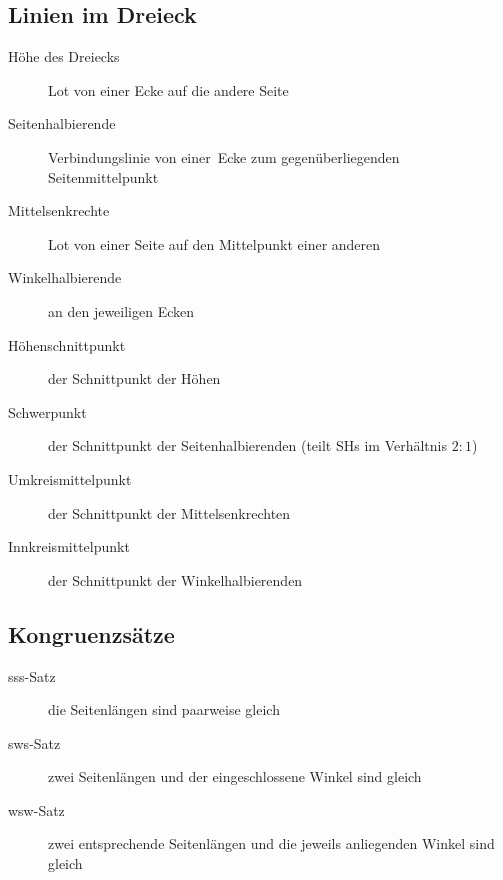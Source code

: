 \documentclass[a4paper,10pt]{article}
\begin{document}
\subsection{Linien im Dreieck}
\begin{description}
\item[Höhe des Dreiecks] Lot von einer Ecke auf die andere Seite
\item[Seitenhalbierende] Verbindungslinie von einer Ecke zum gegenüberliegenden Seitenmittelpunkt
\item[Mittelsenkrechte]  Lot von einer Seite auf den Mittelpunkt einer anderen
\item[Winkelhalbierende] an den jeweiligen Ecken
\item[Höhenschnittpunkt] der Schnittpunkt der Höhen
\item[Schwerpunkt] der Schnittpunkt der Seitenhalbierenden (teilt SHs im Verhältnis $2:1$)
\item[Umkreismittelpunkt] der Schnittpunkt der Mittelsenkrechten
\item[Innkreismittelpunkt] der Schnittpunkt der Winkelhalbierenden
\end{description}

\subsection{Kongruenzsätze}
\begin{description}
\item[sss-Satz] die Seitenlängen sind paarweise gleich
\item[sws-Satz] zwei Seitenlängen und der eingeschlossene Winkel sind gleich
\item[wsw-Satz] zwei entsprechende Seitenlängen und die jeweils anliegenden Winkel sind gleich
\end{description}
\end{document}
